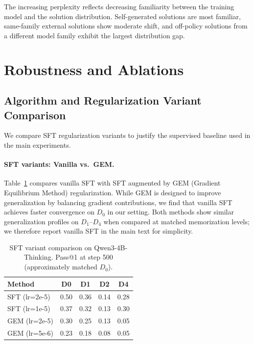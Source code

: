 \documentclass[]{bytedance_seed}
\theoremstyle{plain}
\theoremstyle{definition}
\theoremstyle{remark}
\begin{document}
The increasing perplexity reflects decreasing familiarity between the training model and the solution distribution. Self-generated solutions are most familiar, same-family external solutions show moderate shift, and off-policy solutions from a different model family exhibit the largest distribution gap.
\fi


\section{Robustness and Ablations}
\label{app:ablations}

\subsection{Algorithm and Regularization Variant Comparison}
\label{app:variant-comparison}

We compare SFT regularization variants to justify the supervised baseline used in the main experiments.

\paragraph{SFT variants: Vanilla vs.\ GEM.}
Table~\ref{tab:sft-variants} compares vanilla SFT with SFT augmented by GEM (Gradient Equilibrium Method) regularization. While GEM is designed to improve generalization by balancing gradient contributions, we find that vanilla SFT achieves faster convergence on $D_0$ in our setting. Both methods show similar generalization profiles on $D_1$--$D_4$ when compared at matched memorization levels; we therefore report vanilla SFT in the main text for simplicity.

\begin{table}[h]
\centering
\small
\caption{SFT variant comparison on Qwen3-4B-Thinking. Pass@1 at step 500 (approximately matched $D_0$).}
\label{tab:sft-variants}
\begin{tabular}{lcccc}
\toprule
\textbf{Method} & \textbf{D0} & \textbf{D1} & \textbf{D2} & \textbf{D4} \\
\midrule
SFT (lr=2e-5) & 0.50 & 0.36 & 0.14 & 0.28 \\
SFT (lr=1e-5) & 0.37 & 0.32 & 0.13 & 0.30 \\
GEM (lr=2e-5) & 0.30 & 0.25 & 0.13 & 0.05 \\
GEM (lr=5e-6) & 0.23 & 0.18 & 0.08 & 0.05 \\
\bottomrule
\end{tabular}
\end{table}
\end{document}
